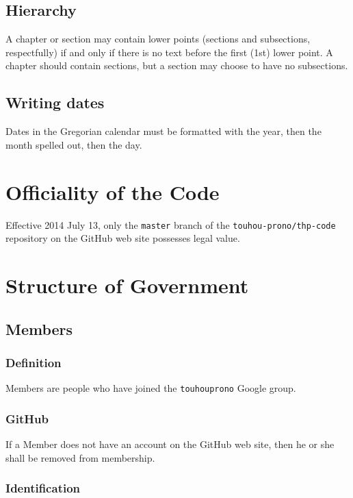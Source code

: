 \documentclass[10pt]{book}
\begin{document}
\section{Hierarchy}

A chapter or section may contain lower points (sections and subsections, respectfully) if and only if there is no text before the first (1st) lower point. A chapter should contain sections, but a section may choose to have no subsections.

\section{Writing dates}

Dates in the Gregorian calendar must be formatted with the year, then the month spelled out, then the day.

\chapter{Officiality of the Code}

Effective 2014 July 13, only the \texttt{master} branch of the \texttt{touhou-prono/thp-code} repository on the GitHub web site possesses legal value.

\chapter{Structure of Government}

\section{Members}

\subsection{Definition}

Members are people who have joined the \texttt{touhouprono} Google group.

\subsection{GitHub}

If a Member does not have an account on the GitHub web site, then he or she shall be removed from membership.

\subsection{Identification}
\end{document}
